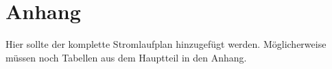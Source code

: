\documentclass[../Bachelorarbeit.tex]{subfiles}
\begin{document}
\section*{Anhang}
\color{red}
Hier sollte der komplette Stromlaufplan hinzugefügt werden. Möglicherweise müssen noch Tabellen aus dem Hauptteil in den Anhang.
\end{document}
